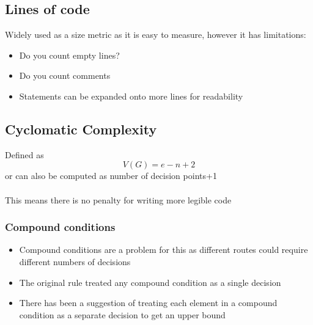 \documentclass{article}[18pt]
\begin{document}
\subsection{Lines of code}
Widely used as a size metric as it is easy to measure, however it has limitations:
\begin{itemize}
	\item Do you count empty lines?
	\item Do you count comments
	\item Statements can be expanded onto more lines for readability
\end{itemize}
\subsection{Cyclomatic Complexity}
Defined as
$$V(G)=e-n+2$$
or can also be computed as number of decision points+1\\
\\
This means there is no penalty for writing more legible code
\subsubsection{Compound conditions}
\begin{itemize}
	\item Compound conditions are a problem for this as different routes could require different numbers of decisions
	\item The original rule treated any compound condition as a single decision
	\item There has been a suggestion of treating each element in a compound condition as a separate decision to get an upper bound
\end{itemize}
\end{document}
